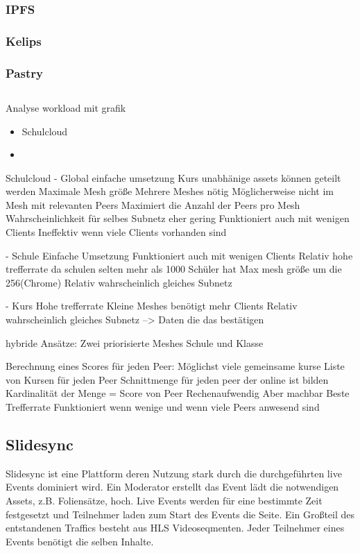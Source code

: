 \subsubsection{IPFS}
\subsubsection{Kelips}
\subsubsection{Pastry}
\subsection{\schulCloud}
Analyse workload mit grafik

\begin{itemize}
	\item Schulcloud
	\item 	
\end{itemize}
Schulcloud
- Global
einfache umsetzung
Kurs unabhänige assets können geteilt werden
Maximale Mesh größe
Mehrere Meshes nötig
Möglicherweise nicht im Mesh mit relevanten Peers
Maximiert die Anzahl der Peers pro Mesh
Wahrscheinlichkeit für selbes Subnetz eher gering
Funktioniert auch mit wenigen Clients
Ineffektiv wenn viele Clients vorhanden sind

- Schule
Einfache Umsetzung
Funktioniert auch mit wenigen Clients
Relativ hohe trefferrate da schulen selten mehr als 1000 Schüler hat
Max mesh größe um die 256(Chrome)
Relativ wahrscheinlich gleiches Subnetz

- Kurs
Hohe trefferrate
Kleine Meshes
benötigt mehr Clients
Relativ wahrscheinlich gleiches Subnetz --> Daten die das bestätigen

hybride Ansätze:
Zwei priorisierte Meshes Schule und Klasse

Berechnung eines Scores für jeden Peer:
Möglichst viele gemeinsame kurse
Liste von Kursen für jeden Peer
Schnittmenge für jeden peer der online ist bilden
Kardinalität der Menge = Score von Peer
Rechenaufwendig Aber machbar
Beste Trefferrate
Funktioniert wenn wenige und wenn viele Peers anwesend sind

\subsection{Slidesync}
Slidesync ist eine Plattform deren Nutzung stark durch die durchgeführten live Events dominiert wird. Ein Moderator erstellt das Event lädt die notwendigen Assets, z.B. Foliensätze, hoch. Live Events werden für eine bestimmte Zeit festgesetzt und Teilnehmer laden zum Start des Events die Seite. Ein Großteil des entstandenen Traffics besteht aus HLS Videoseqmenten. Jeder Teilnehmer eines Events benötigt die selben Inhalte. 

